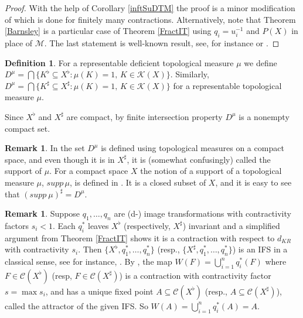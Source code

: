 \documentclass[sn-mathphys-num]{sn-jnl}%
\theoremstyle{thmstyleone}%
\theoremstyle{definition}
\newtheorem{definition}[theorem]{Definition}
\newtheorem{remark}[theorem]{Remark}
\begin{document}
\begin{proof}
With the help of Corollary \ref{inftSuDTM} the proof is a minor modification of \cite[Ch. IX, Th. 6.1]{Barnsley} which is done for finitely many contractions.
Alternatively, note that Theorem \ref{Barnsley} is a particular case of Theorem \ref{FractIT} using $q_i = u_i^{-1}$ and $P(X)$ in place of $ \mathcal M$. 
The last statement is well-known result, see, for instance \cite[Ch. IX, Th. 6.2]{Barnsley} or \cite[Th. 2.8]{Falconer}. 
 \end{proof}

\begin{definition}
For a representable deficient topological measure $\mu$ we define $D^\mu   = \bigcap \{ K^{\flat} \subseteq X^{\flat}: \mu(K) = 1, \, K \in \mathscr{K}(X)\}$.
Similarly,  $D^\mu   = \bigcap \{ K^{\sharp} \subseteq X^{\sharp}: \mu(K) = 1, \, K \in \mathscr{K}(X)\}$ for a representable topological measure $\mu$.
\end{definition}

Since $X^\flat$ and $X^\sharp$ are compact, by finite intersection property  $D^\mu$ is a nonempty compact set. 

\begin{remark}
In \cite{Aarnes:ITfirst} the set $D^\mu$  is defined using topological measures on a compact space, and even though it is in $X^\sharp$, it  
is (somewhat confusingly) called the support of $\mu$.
For a compact space $X$ the notion of a support  of a topological measure $ \mu$,  $ supp \,  \mu$,  is defined in \cite{Laberge}.
It is a closed subset of $X$, and it is easy to see that  $(supp \  \mu) ^\sharp = D^\mu$.
\end{remark}

\begin{remark} \label{IFSord}
Suppose  $q_1, \ldots, q_n$ are  (d-) image transformations with contractivity factors $s_i <1$. 
Each $q_i^*$ leaves $X^{\flat}$ (respectively, $X^\sharp$) invariant 
and a simplified argument from Theorem \ref{FractIT} shows it is a contraction with respect to $d_{KR}$ with contractivity $s_i$. 
Then  $\{ X^{\flat}, q_1^*, \ldots, q_n^*\} $ (resp., $\{ X^{\sharp}, q_1^*, \ldots, q_n^*\} $) is an IFS in a  classical sense, see 
for instance, \cite[Ch. III, Def. 7.1]{Barnsley}. 
By \cite[Ch. III, Th. 7.1]{Barnsley}, the map 
$W(F) = \bigcup_{i=1}^n q_i^*(F)$ where $F \in \mathscr{C}  (X^{\flat})$ (resp,  $F \in \mathscr{C}  (X^{\sharp})$) 
is a contraction with contractivity factor $s = \max s_i $, 
and has a unique fixed point $A \subseteq \mathscr{C} (X^{\flat})$ (resp., $A \subseteq \mathscr{C} (X^{\sharp})$),
called the attractor of the given IFS. So $W(A) =  \bigcup_{i=1}^n q_i^*(A)  = A$.
\end{remark}
\end{document}

